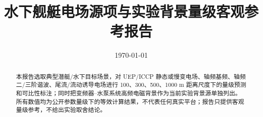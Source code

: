 \documentclass[UTF8,a4paper,11pt]{ctexart}
\title{水下舰艇电场源项与实验背景量级客观参考报告}
\author{}
\date{\today}
\begin{document}
\maketitle

\begin{abstract}
本报告选取典型潜艇/水下目标场景，对 UEP/ICCP 静态或慢变电场、轴频基频、轴频二/三阶谐波、尾流/流动诱导电场进行 100、300、500、1000 m 距离尺度下的量级预测和可比性标注；同时把变频器--水泵系统高频电磁背景作为当前实验背景源单独列出。所有数值均为公开参数量级下的等效计算结果，不代表任何真实平台；报告只提供客观量级参考，不给出实验取舍结论。
\end{abstract}

\tableofcontents








\nocite{*}


\end{document}
